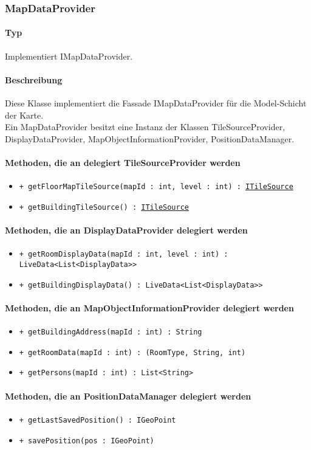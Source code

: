 \subsubsection{MapDataProvider}
\paragraph*{Typ}
Implementiert IMapDataProvider.
\paragraph*{Beschreibung}
Diese Klasse implementiert die Fassade IMapDataProvider für die Model-Schicht der Karte.\\
Ein MapDataProvider besitzt eine Instanz der Klassen 
TileSourceProvider, DisplayDataProvider, MapObjectInformationProvider, PositionDataManager.

\paragraph*{Methoden, die an delegiert TileSourceProvider werden}
\begin{itemize}
    \item \texttt{+ getFloorMapTileSource(mapId : int, level : int) : \href{https://osmdroid.github.io/osmdroid/javadocAll/org/osmdroid/tileprovider/tilesource/ITileSource.html}{ITileSource}}
    \item \texttt{+ getBuildingTileSource() : \href{https://osmdroid.github.io/osmdroid/javadocAll/org/osmdroid/tileprovider/tilesource/ITileSource.html}{ITileSource}}
\end{itemize}

\paragraph*{Methoden, die an DisplayDataProvider delegiert werden}
\begin{itemize}
    \item \texttt{+ getRoomDisplayData(mapId : int, level : int) : LiveData<List<DisplayData>>}
    \item \texttt{+ getBuildingDisplayData() : LiveData<List<DisplayData>>}
\end{itemize}

\paragraph*{Methoden, die an MapObjectInformationProvider delegiert werden}
\begin{itemize}
    \item \texttt{+ getBuildingAddress(mapId : int) : String}
    \item \texttt{+ getRoomData(mapId : int) : (RoomType, String, int)}
    \item \texttt{+ getPersons(mapId : int) : List<String>}
\end{itemize}

\paragraph*{Methoden, die an PositionDataManager delegiert werden}
\begin{itemize}
    \item \texttt{+ getLastSavedPosition() : IGeoPoint}
    \item \texttt{+ savePosition(pos : IGeoPoint)}
\end{itemize}
